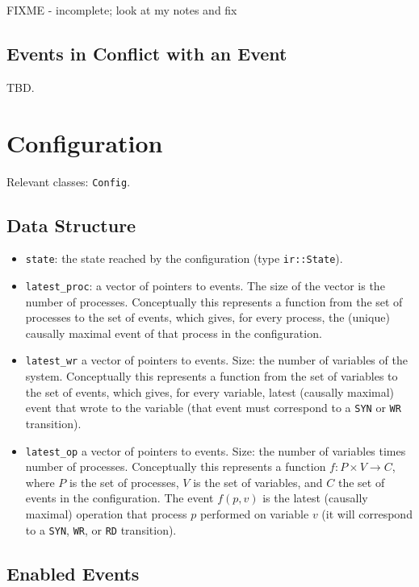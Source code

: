 \documentclass{llncs}
\begin{document}
FIXME - incomplete; look at my notes and fix


\subsection{Events in Conflict with an Event}

TBD.

\section{Configuration}
Relevant classes:
\verb!Config!.

\subsection{Data Structure}

\begin{itemize}
\item
  \verb!state!: the state reached by the configuration (type \verb!ir::State!).
\item
  \verb!latest_proc!:
  a vector of pointers to events. The size of the vector is the number of
  processes. Conceptually this represents a function from the set of processes
  to the set of events, which gives, for every process, the (unique) causally
  maximal event of that process in the configuration.

\item
  \verb!latest_wr!
  a vector of pointers to events. Size: the number of variables of the system.
  Conceptually this represents a function from the set of variables
  to the set of events, which gives, for every variable, latest (causally
  maximal) event that wrote to the variable (that event must correspond to a
  \verb!SYN! or \verb!WR! transition).

\item
  \verb!latest_op!
  a vector of pointers to events. Size: the number of variables times number of
  processes.
  Conceptually this represents a function $f \colon P \times V \to C$,
  where $P$ is the set of processes, $V$ is the set of variables, and $C$ the
  set of events in the configuration.
  The event $f (p,v)$ is the latest (causally maximal) operation that process
  $p$ performed on variable $v$ (it will correspond to a \verb!SYN!, \verb!WR!,
  or \verb!RD! transition).
\end{itemize}

\subsection{Enabled Events}
\end{document}
